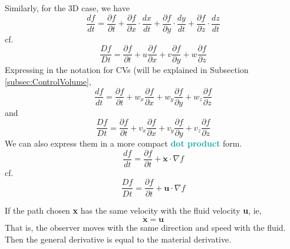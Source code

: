 \documentclass[twoside]{article}
\newcommand{\highlightbluetext}[1]{\textcolor[HTML]{09ACA6}{\textbf{#1}}}
\numberwithin{equation}{section}
\begin{document}
	Similarly, for the 3D case, we have
	\begin{equation}
		\frac{df}{dt} = \frac{\partial f}{\partial t}+\frac{\partial f}{\partial x} \cdot \frac{dx}{dt}+\frac{\partial f}{\partial y} \cdot \frac{dy}{dt}+\frac{\partial f}{\partial z} \cdot \frac{dz}{dt}
		\label{eq:GeneralDerivativeExpanded}
	\end{equation}
	cf.
	\begin{equation}
		\frac{Df}{Dt} = \frac{\partial f}{\partial t}+u \frac{\partial f}{\partial x}+v \frac{\partial f}{\partial y}+w \frac{\partial f}{\partial z}
		\label{eq:MaterialDerivativeExpanded}
	\end{equation}
	Expressing in the notation for CVs (will be explained in Subsection \ref{subsec:ControlVolume},
	\begin{equation}
		\frac{df}{dt} = \frac{\partial f}{\partial t}+w_x\frac{\partial f}{\partial x} +w_y\frac{\partial f}{\partial y}+w_z\frac{\partial f}{\partial z}
		\label{eq:GeneralDerivativeExpanded2}
	\end{equation}
	and
	\begin{equation}
		\frac{Df}{Dt} = \frac{\partial f}{\partial t}+v_x \frac{\partial f}{\partial x}+v_y \frac{\partial f}{\partial y}+v_z \frac{\partial f}{\partial z}
		\label{eq:MaterialDerivativeExpanded2}
	\end{equation}
	We can also express them in a more compact \highlightbluetext{dot product} form.
	\begin{equation}
		\frac{df}{dt} = \frac{\partial f}{\partial t}+\dot{\textbf{x}} \cdot \nabla f
		\label{eq:GeneralDerivativeDotProduct}
	\end{equation}
	cf.
	\begin{equation}
		\frac{Df}{Dt} = \frac{\partial f}{\partial t}+\textbf{u} \cdot \nabla f
		\label{eq:MaterialDerivativeDotProduct}
	\end{equation}
	
	If the path chosen \textbf{x} has the same velocity with the fluid velocity \textbf{u}, ie,
	\begin{equation*}
		\dot{\textbf{x}} = \textbf{u}
	\end{equation*}
	That is, the observer moves with the same direction and speed with the fluid. Then the general derivative is equal to the material derivative.
	
\end{document}
